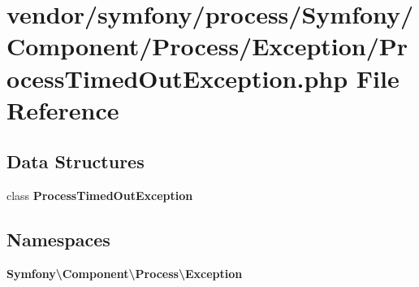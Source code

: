 \section{vendor/symfony/process/\+Symfony/\+Component/\+Process/\+Exception/\+Process\+Timed\+Out\+Exception.php File Reference}
\label{_process_timed_out_exception_8php}
\subsection*{Data Structures}
\begin{DoxyCompactItemize}
\item 
class {\bf Process\+Timed\+Out\+Exception}
\end{DoxyCompactItemize}
\subsection*{Namespaces}
\begin{DoxyCompactItemize}
\item 
 {\bf Symfony\textbackslash{}\+Component\textbackslash{}\+Process\textbackslash{}\+Exception}
\end{DoxyCompactItemize}
